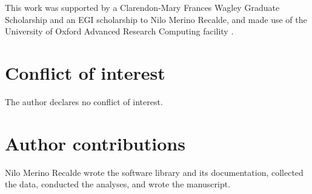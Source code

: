 This work was supported by a Clarendon-Mary Frances Wagley Graduate Scholarship
and an EGI scholarship to Nilo Merino Recalde, and made use of the University of Oxford Advanced
Research Computing facility \parencite{richards2015}.

\section{Conflict of interest}

The author declares no conflict of interest.

\section{Author contributions}

Nilo Merino Recalde wrote the software library and its documentation, collected the data,
conducted the analyses, and wrote the manuscript.

\renewcommand{\cleardoublepage}{}
\renewcommand{\clearpage}{}
\printbibliography
